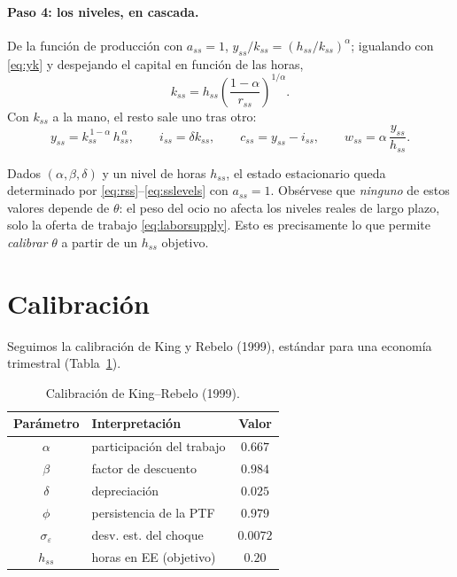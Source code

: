 \documentclass[11pt,a4paper]{report}
\newcounter{tcbprop}[section]
\renewcommand{\thetcbprop}{\thesection.\arabic{tcbprop}}
\newenvironment{proposition}[1][]{%
  \refstepcounter{tcbprop}%
  \begin{tcolorbox}[propstyle, title={Proposición~\thetcbprop%
    \ifx\relax#1\relax\else\ (#1)\fi}]}%
{\end{tcolorbox}}
\begin{document}
\paragraph{Paso 4: los niveles, en cascada.} De la función de producción con
$a_{ss}=1$, $y_{ss}/k_{ss}=(h_{ss}/k_{ss})^{\alpha}$; igualando con \eqref{eq:yk} y
despejando el capital en función de las horas,
\begin{equation}
k_{ss}=h_{ss}\left(\frac{1-\alpha}{r_{ss}}\right)^{1/\alpha}. \label{eq:kss}
\end{equation}
Con $k_{ss}$ a la mano, el resto sale uno tras otro:
\begin{equation}
y_{ss}=k_{ss}^{\,1-\alpha}\,h_{ss}^{\,\alpha},\qquad
i_{ss}=\delta k_{ss},\qquad
c_{ss}=y_{ss}-i_{ss},\qquad
w_{ss}=\alpha\,\frac{y_{ss}}{h_{ss}}. \label{eq:sslevels}
\end{equation}

\begin{proposition}[El estado estacionario no depende de $\theta$]
Dados $(\alpha,\beta,\delta)$ y un nivel de horas $h_{ss}$, el estado
estacionario queda determinado por \eqref{eq:rss}--\eqref{eq:sslevels} con
$a_{ss}=1$. Obsérvese que \emph{ninguno} de estos valores depende de $\theta$:
el peso del ocio no afecta los niveles reales de largo plazo, solo la oferta de
trabajo \eqref{eq:laborsupply}. Esto es precisamente lo que permite \emph{calibrar}
$\theta$ a partir de un $h_{ss}$ objetivo.
\end{proposition}

\section{Calibración}
\label{sec:calib}

Seguimos la calibración de King y Rebelo (1999), estándar para una economía
trimestral (Tabla~\ref{tab:calib}).

\begin{table}[H]
\centering\small
\begin{tabular}{clc}
\toprule
\textbf{Parámetro} & \textbf{Interpretación} & \textbf{Valor} \\
\midrule
$\alpha$ & participación del trabajo & $0.667$ \\
$\beta$ & factor de descuento & $0.984$ \\
$\delta$ & depreciación & $0.025$ \\
$\phi$ & persistencia de la PTF & $0.979$ \\
$\sigma_\varepsilon$ & desv. est. del choque & $0.0072$ \\
$h_{ss}$ & horas en EE (objetivo) & $0.20$ \\
\bottomrule
\end{tabular}
\caption{Calibración de King--Rebelo (1999).}
\label{tab:calib}
\end{table}
\end{document}

